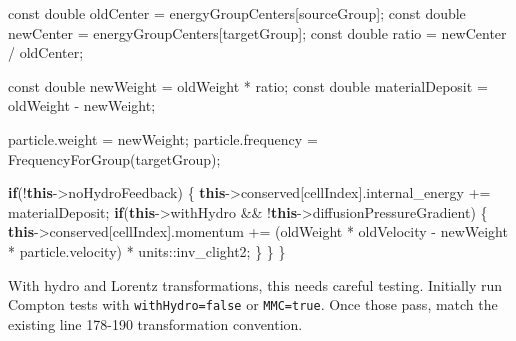 \documentclass[
]{article}
\newenvironment{Shaded}{}{}
\newcommand{\AttributeTok}[1]{\textcolor[rgb]{0.49,0.56,0.16}{#1}}
\newcommand{\ControlFlowTok}[1]{\textcolor[rgb]{0.00,0.44,0.13}{\textbf{#1}}}
\newcommand{\DataTypeTok}[1]{\textcolor[rgb]{0.56,0.13,0.00}{#1}}
\newcommand{\KeywordTok}[1]{\textcolor[rgb]{0.00,0.44,0.13}{\textbf{#1}}}
\newcommand{\NormalTok}[1]{#1}
\newcommand{\OperatorTok}[1]{\textcolor[rgb]{0.40,0.40,0.40}{#1}}
\begin{document}
\begin{Shaded}
\begin{Highlighting}[]
    \AttributeTok{const} \DataTypeTok{double}\NormalTok{ oldCenter }\OperatorTok{=}\NormalTok{ energyGroupCenters}\OperatorTok{[}\NormalTok{sourceGroup}\OperatorTok{];}
    \AttributeTok{const} \DataTypeTok{double}\NormalTok{ newCenter }\OperatorTok{=}\NormalTok{ energyGroupCenters}\OperatorTok{[}\NormalTok{targetGroup}\OperatorTok{];}
    \AttributeTok{const} \DataTypeTok{double}\NormalTok{ ratio }\OperatorTok{=}\NormalTok{ newCenter }\OperatorTok{/}\NormalTok{ oldCenter}\OperatorTok{;}

    \AttributeTok{const} \DataTypeTok{double}\NormalTok{ newWeight }\OperatorTok{=}\NormalTok{ oldWeight }\OperatorTok{*}\NormalTok{ ratio}\OperatorTok{;}
    \AttributeTok{const} \DataTypeTok{double}\NormalTok{ materialDeposit }\OperatorTok{=}\NormalTok{ oldWeight }\OperatorTok{{-}}\NormalTok{ newWeight}\OperatorTok{;}

\NormalTok{    particle}\OperatorTok{.}\NormalTok{weight }\OperatorTok{=}\NormalTok{ newWeight}\OperatorTok{;}
\NormalTok{    particle}\OperatorTok{.}\NormalTok{frequency }\OperatorTok{=}\NormalTok{ FrequencyForGroup}\OperatorTok{(}\NormalTok{targetGroup}\OperatorTok{);}

    \ControlFlowTok{if}\OperatorTok{(!}\KeywordTok{this}\OperatorTok{{-}\textgreater{}}\NormalTok{noHydroFeedback}\OperatorTok{)}
    \OperatorTok{\{}
        \KeywordTok{this}\OperatorTok{{-}\textgreater{}}\NormalTok{conserved}\OperatorTok{[}\NormalTok{cellIndex}\OperatorTok{].}\NormalTok{internal\_energy }\OperatorTok{+=}\NormalTok{ materialDeposit}\OperatorTok{;}
        \ControlFlowTok{if}\OperatorTok{(}\KeywordTok{this}\OperatorTok{{-}\textgreater{}}\NormalTok{withHydro }\OperatorTok{\&\&} \OperatorTok{!}\KeywordTok{this}\OperatorTok{{-}\textgreater{}}\NormalTok{diffusionPressureGradient}\OperatorTok{)}
        \OperatorTok{\{}
            \KeywordTok{this}\OperatorTok{{-}\textgreater{}}\NormalTok{conserved}\OperatorTok{[}\NormalTok{cellIndex}\OperatorTok{].}\NormalTok{momentum }\OperatorTok{+=}
                \OperatorTok{(}\NormalTok{oldWeight }\OperatorTok{*}\NormalTok{ oldVelocity }\OperatorTok{{-}}\NormalTok{ newWeight }\OperatorTok{*}\NormalTok{ particle}\OperatorTok{.}\NormalTok{velocity}\OperatorTok{)} \OperatorTok{*}\NormalTok{ units}\OperatorTok{::}\NormalTok{inv\_clight2}\OperatorTok{;}
        \OperatorTok{\}}
    \OperatorTok{\}}
\OperatorTok{\}}
\end{Highlighting}
\end{Shaded}

With hydro and Lorentz transformations, this needs careful testing.
Initially run Compton tests with \texttt{withHydro=false} or
\texttt{MMC=true}. Once those pass, match the existing line 178-190
transformation convention.
\end{document}
